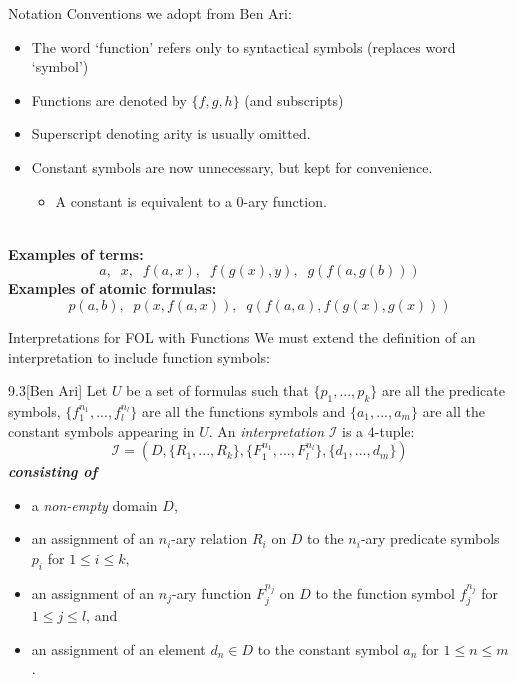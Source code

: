\documentclass[style=sailor,size=12pt]{powerdot}
\begin{document}
\begin{wideslide}[bm=,toc=]{Notation}
Conventions we adopt from Ben Ari:
\begin{itemize}
\item The word `function' refers only to syntactical symbols (replaces word `symbol') 
\item Functions are denoted by $\{f,g,h\}$ (and subscripts)
\item Superscript denoting arity is usually omitted.
\item Constant symbols are now unnecessary, but kept for convenience.
\begin{itemize}
\item A constant is equivalent to a $0$-ary function.
\end{itemize}
\end{itemize}
~\\
{\bf Examples of terms:}
\[
  a,\;\; x,\;\; f(a,x),\;\; f(g(x),y),\;\; g(f(a,g(b)))
  \]
{\bf Examples of atomic formulas:}
\[
  p(a,b),\;\; p(x,f(a,x)),\;\; q(f(a,a), f(g(x),g(x)))
\]
\end{wideslide}

\begin{wideslide}[bm=,toc=]{Interpretations for FOL with Functions}
We must extend the definition of an interpretation to include function symbols:
\begin{defn}{9.3}[Ben Ari]
Let $U$ be a set of formulas such that $\{p_1,...,p_k\}$ are all the predicate
symbols, $\{f_1^{n_1},...,f_l^{n_l}\}$ are all the functions symbols and
$\{a_1,...,a_m\}$ are all the constant symbols appearing in $U$. An
\emph{interpretation} $\mathcal{I}$ is a $4$-tuple:
\[
  \mathcal{I} = (D, \{R_1,...,R_k\}, \{F_1^{n_1},...,F_l^{n_l}\},\{d_1,...,d_m\})
  \]
{\bf \emph{consisting of}}
\end{defn}
\vspace{-3ex}
\begin{itemize}
\item<2-> a \emph{non-empty} domain $D$,
\item<3-> an assignment of an $n_i$-ary relation $R_i$ on $D$ to the $n_i$-ary predicate 
      symbols $p_i$ for $1 \leq i \leq k$, 
\item<4-> an assignment of an $n_j$-ary function $F_j^{n_j}$ on $D$ to the
      function symbol $f_j^{n_j}$ for $1 \leq j \leq l$, and 
\item<5-> an assignment of an element $d_n \in D$ to the constant symbol $a_n$ for $1 \leq n \leq m$.
\end{itemize}
\end{wideslide}
\end{document}
